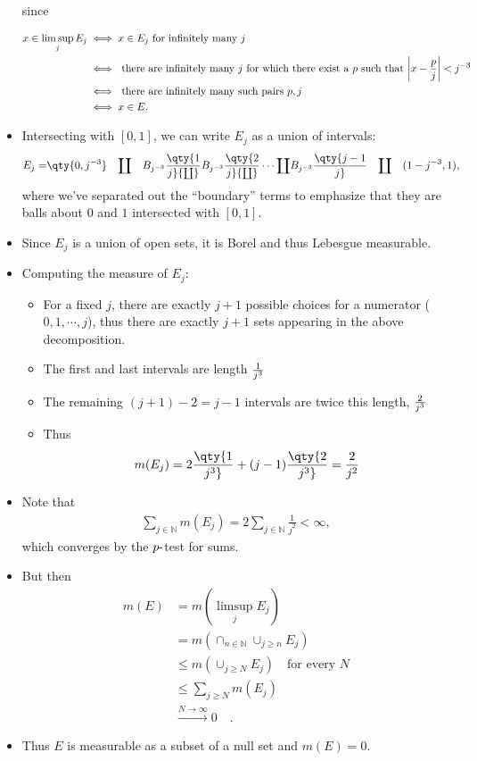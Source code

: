 \begin{solution}
\begin{itemize}
  since

  \begin{align*}
  x \in \limsup_j E_j 
  &\iff x \in E_j \text{ for infinitely many } j  \\
  &\iff \text{ there are infinitely many $j$ for which there exist a $p$ such that } {\left\lvert {x - {p\over j}} \right\rvert} < j^{-3}  \\
  &\iff \text{ there are infinitely many such pairs $p, j$}  \\
  &\iff x\in E
  .\end{align*}
\item
  Intersecting with \([0, 1]\), we can write \(E_j\) as a union of
  intervals:
  \begin{align*}
  E_j =& \qty{0, {j^{-3}}} 
  \quad {\coprod}\quad 
  B_{j^{-3}}\qty{1\over j} {\coprod}
  B_{j^{-3}}\qty{2\over j} {\coprod}
  \cdots {\coprod}
  B_{j^{-3}}\qty{j-1\over j} 
  \quad {\coprod}\quad 
  (1 - {j^{-3}}, 1)
  ,\end{align*}
  where we've separated out the ``boundary'' terms to emphasize that
  they are balls about \(0\) and \(1\) intersected with \([0, 1]\).
\item
  Since \(E_j\) is a union of open sets, it is Borel and thus Lebesgue
  measurable.
\item
  Computing the measure of \(E_j\):

  \begin{itemize}
  \item
    For a fixed \(j\), there are exactly \(j+1\) possible choices for a
    numerator (\(0, 1, \cdots, j\)), thus there are exactly \(j+1\) sets
    appearing in the above decomposition.
  \item
    The first and last intervals are length \(1 \over j^3\)
  \item
    The remaining \((j+1)-2 = j-1\) intervals are twice this length,
    \(2 \over j^3\)
  \item
    Thus
    \begin{align*}
    m(E_j) = 2 \qty{1 \over j^3} + (j-1) \qty{2 \over j^3} = {2 \over j^2}
    \end{align*}
  \end{itemize}
\item
  Note that
  \begin{align*}
  \sum_{j\in {\mathbb{N}}} m(E_j) =  2\sum_{j\in {\mathbb{N}}} \frac 1 {j^2} < \infty
  ,\end{align*}
  which converges by the \(p{\hbox{-}}\)test for sums.
\item
  But then
  \begin{align*}
  m(E) 
  &= m(\limsup_j E_j) \\
  &= m(\cap_{n\in {\mathbb{N}}} \cup_{j\geq n} E_j) \\
  &\leq m(\cup_{j\geq N} E_j) \quad\text{for every } N \\
  &\leq \sum_{j\geq N} m(E_j) \\
  &\overset{N\to\infty}\to 0 \quad\text{}
  .\end{align*}
\item
  Thus \(E\) is measurable as a subset of a null set and \(m(E) = 0\).
\end{itemize}


\end{solution}
